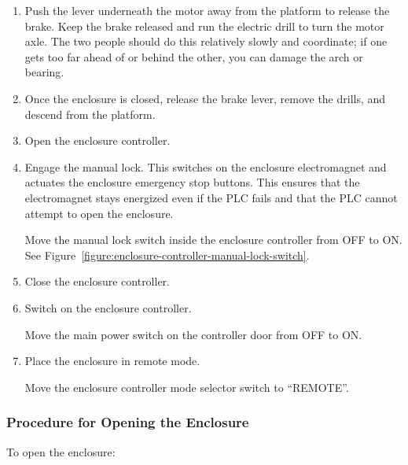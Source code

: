 \begin{enumerate}
\item
Push the lever underneath the motor away from the platform to release the brake. Keep the brake released and run the electric drill to turn the motor axle. The two people should do this relatively slowly and coordinate; if one gets too far ahead of or behind the other, you can damage the arch or bearing.

\item
Once the enclosure is closed, release the brake lever, remove the drills, and descend from the platform.

\item
Open the enclosure controller.

\item
Engage the manual lock. This switches on the enclosure electromagnet and actuates the enclosure emergency stop buttons. This ensures that the electromagnet stays energized even if the PLC fails and that the PLC cannot attempt to open the enclosure.

Move the manual lock switch inside the enclosure controller from OFF to ON. See Figure~\ref{figure:enclosure-controller-manual-lock-switch}.

\item
Close the enclosure controller.

\item
Switch on the enclosure controller.

Move the main power switch on the controller door from OFF to ON.

\item
Place the enclosure in remote mode.

Move the enclosure controller mode selector switch to “REMOTE”.

\end{enumerate}

\subsubsection{Procedure for Opening the Enclosure}

To open the enclosure:

